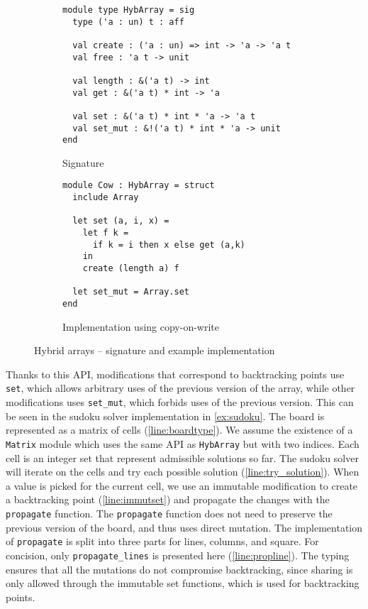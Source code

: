 \begin{figure}
  \centering
  \begin{subfigure}{0.48\linewidth}
\begin{lstlisting}
module type HybArray = sig
  type ('a : un) t : aff
  
  val create : ('a : un) => int -> 'a -> 'a t
  val free : 'a t -> unit

  val length : &('a t) -> int
  val get : &('a t) * int -> 'a

  val set : &('a t) * int * 'a -> 'a t
  val set_mut : &!('a t) * int * 'a -> unit
end
\end{lstlisting}
    \caption{Signature}
    \label{sig:hybarray}
  \end{subfigure}\hfill
  \begin{subfigure}{0.5\linewidth}
\begin{lstlisting}
module Cow : HybArray = struct
  include Array

  let set (a, i, x) =
    let f k =
      if k = i then x else get (a,k)
    in
    create (length a) f
  
  let set_mut = Array.set
end
\end{lstlisting}
    \caption{Implementation using copy-on-write}
    \label{ex:cow}
  \end{subfigure}
  \caption{Hybrid arrays -- signature and example implementation}
\end{figure}



Thanks to this API, modifications that correspond to backtracking points
use \lstinline/set/, which allows arbitrary uses of the previous version
of the array, while other modifications uses \lstinline/set_mut/, which
forbids uses of the previous version.
This can be seen in the sudoku solver implementation in \cref{ex:sudoku}.
The board is represented as a matrix of cells (\cref{line:boardtype}).
We assume the existence of a \lstinline/Matrix/ module which uses the same API
as \lstinline/HybArray/ but with two indices.
Each cell is an integer
set that represent admissible solutions so far. The sudoku solver will
iterate on the cells and try each possible solution (\cref{line:try_solution}).
When a value is picked for the current cell, we use an immutable modification
to create a backtracking point (\cref{line:immutset}) and propagate
the changes with the \lstinline/propagate/ function. The \lstinline/propagate/
function does not need to preserve the previous
version of the board, and thus uses direct mutation.
The implementation of \lstinline/propagate/ is split into three parts
for lines, columns, and square. For concision, only \lstinline/propagate_lines/ is
presented here (\cref{line:propline}).
The typing ensures that all the mutations do not compromise
backtracking, since sharing is only allowed through
the immutable set functions, which is used for backtracking points.

